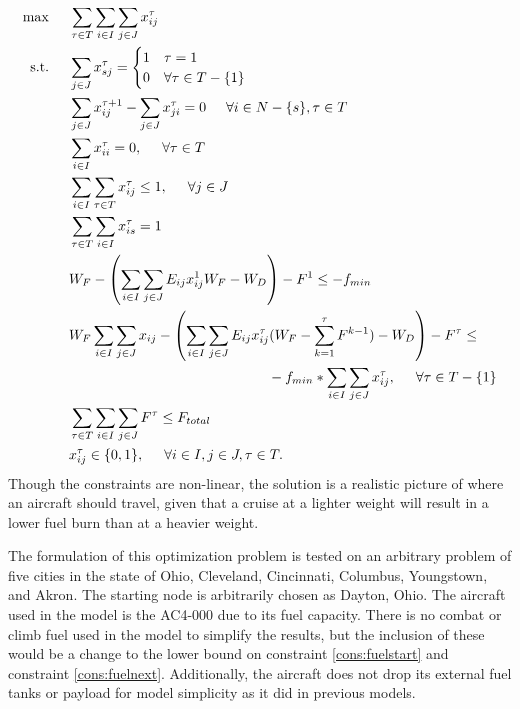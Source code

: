 \begin{align}
\max \hspace{0.5cm} & \sum_{\tau\in T}\sum_{i\in I}\sum_{j\in J}x_{ij}^\tau\\
\text{s.t.}\hspace{0.5cm}&\sum_{j\in J} x_{sj}^{\tau} = \begin{cases} 
1 & \tau = 1\\
0 & \forall\tau\in T-\{1\} \end{cases} \\
&\sum_{j\in J} x_{ij}^{\tau+1}-\sum_{j\in J}x^{\tau}_{ji} = 0 \hspace{0.5cm} \forall i\in N-\{s\},\tau \in T \\
&\sum_{i\in I}x_{ii}^{\tau} = 0, \hspace{0.5cm} \forall \tau \in T \\
&\sum_{i\in I}\sum_{\tau\in T} x_{ij}^\tau\leq 1, \hspace{0.5cm} \forall j \in J\\
&\sum_{\tau\in T}\sum_{i\in I} x_{is}^\tau = 1\\
&W_F-\left(\sum_{i\in I}\sum_{j\in J}E_{ij}x_{ij}^1W_F - W_D\right) - F^{1}\leq -f_{min} \\
&W_F\sum_{i\in I}\sum_{j\in J}x_{ij}-\left(\sum_{i\in I}\sum_{j\in J}E_{ij}x_{ij}^{\tau}(W_F-\sum_{k = 1}^{\tau}F^{k-1}) - W_D\right) - F^{\tau}\leq \nonumber\\
&\hspace{5cm}-f_{min}*\sum_{i\in I}\sum_{j\in J}x_{ij}^\tau, \hspace{.5cm} \forall \tau \in T-\{1\}\\
&\sum_{\tau\in T}\sum_{i\in I}\sum_{j\in J} F^{\tau} \leq F_{total}\\
&x_{ij}^{\tau}\in \{0,1\}, \hspace{0.5cm} \forall i\in I,j\in J,\tau\in T.
\end{align}
Though the constraints are non-linear, the solution is a realistic picture of where an aircraft should travel, given that a cruise at a lighter weight will result in a lower fuel burn than at a heavier weight. \par
The formulation of this optimization problem is tested on an arbitrary problem of five cities in the state of Ohio, Cleveland, Cincinnati, Columbus, Youngstown, and Akron. The starting node is arbitrarily chosen as Dayton, Ohio. The aircraft used in the model is the AC4-000 due to its fuel capacity. There is no combat or climb fuel used in the model to simplify the results, but the inclusion of these would be a change to the lower bound on constraint \eqref{cons:fuelstart} and constraint \eqref{cons:fuelnext}. Additionally, the aircraft does not drop its external fuel tanks or payload for model simplicity as it did in previous models.\par

